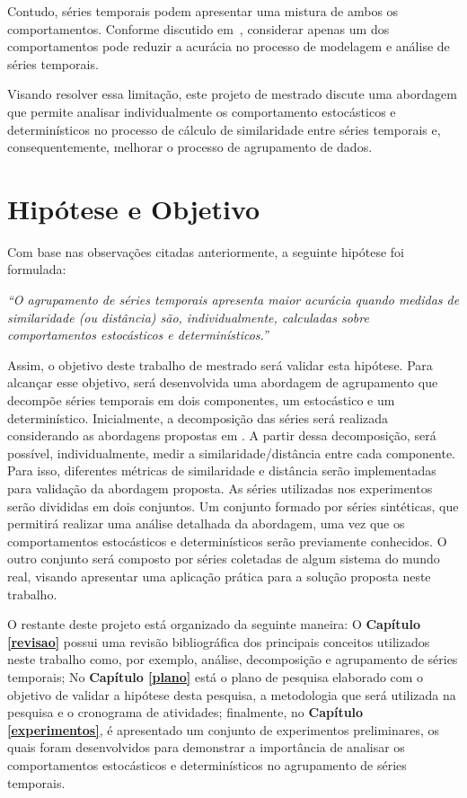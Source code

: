 \documentclass[qual, classic, a4paper]{ufbathesis}
\begin{document}
Contudo, séries temporais podem apresentar uma mistura de ambos os comportamentos. Conforme discutido em~, considerar apenas um dos comportamentos pode reduzir a acurácia no processo de modelagem e análise de séries temporais.

Visando resolver essa limitação, este projeto de mestrado discute uma abordagem que permite analisar individualmente os comportamento estocásticos e determinísticos no processo de cálculo de similaridade entre séries temporais e, consequentemente, melhorar o processo de agrupamento de dados.

\section{Hipótese e Objetivo}

Com base nas observações citadas anteriormente, a seguinte hipótese foi formulada:

\begin{center}
\textit{``O agrupamento de séries temporais apresenta maior acurácia quando medidas de similaridade (ou distância) são, individualmente, calculadas sobre comportamentos estocásticos e determinísticos.''}
\end{center}

Assim, o objetivo deste trabalho de mestrado será validar esta hipótese. Para alcançar esse objetivo, será desenvolvida uma abordagem de agrupamento que decompõe séries temporais em dois componentes, um estocástico e um determinístico. Inicialmente, a decomposição das séries será realizada considerando as abordagens propostas em . A partir dessa decomposição, será possível, individualmente, medir a similaridade/distância entre cada componente. Para isso, diferentes métricas de similaridade e distância serão implementadas para validação da abordagem proposta. As séries utilizadas nos experimentos serão divididas em dois conjuntos. Um conjunto formado por séries sintéticas, que permitirá realizar uma análise detalhada da abordagem, uma vez que os comportamentos estocásticos e determinísticos serão previamente conhecidos. O outro conjunto será composto por séries coletadas de algum sistema do mundo real, visando apresentar uma aplicação prática para a solução proposta neste trabalho.

O restante deste projeto  está organizado da seguinte maneira: O \textbf{Capítulo \ref{revisao}} possui uma revisão bibliográfica dos principais conceitos utilizados neste trabalho como, por exemplo, análise, decomposição e agrupamento de séries temporais; No \textbf{Capítulo \ref{plano}} está o plano de pesquisa elaborado com o objetivo de validar a hipótese desta pesquisa, a metodologia que será utilizada na pesquisa e o cronograma de atividades; finalmente, no \textbf{Capítulo \ref{experimentos}}, é apresentado um conjunto de experimentos preliminares, os quais foram desenvolvidos para demonstrar a importância de analisar os comportamentos estocásticos e determinísticos no agrupamento de séries temporais.
\end{document}

